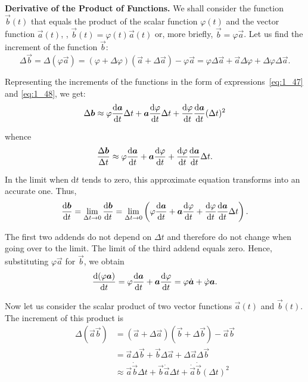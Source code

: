 \textbf{Derivative of the Product of Functions.} We shall consider the function $\vec{b}(t)$ that equals the product of the scalar function $\varphi(t)$ and the vector function $\vec{a}(t)$, \ie, $\vec{b}(t)=\varphi(t)\vec{a}(t)$ or, more briefly, $\vec{b}=\varphi\vec{a}$. Let us find the increment of the function $\vec{b}$:
\begin{equation*}
\Delta\vec{b} = \Delta(\varphi\vec{a}) = (\varphi + \Delta\varphi)(\vec{a} + \Delta\vec{a}) - \varphi\vec{a} = \varphi\Delta\vec{a} + \vec{a}\Delta\varphi + \Delta\varphi\Delta\vec{a}.
\end{equation*}

\noindent
Representing the increments of the functions in the form of expressions~\eqref{eq:1_47} and \eqref{eq:1_48}, we get:
\begin{equation*}
\Delta\boldsymbol{b} \approx \varphi\frac{\mathrm{d}\boldsymbol{a}}{\mathrm{d} t}\Delta t + \boldsymbol{a}\frac{\mathrm{d}\varphi}{\mathrm{d} t}\Delta t + \frac{\mathrm{d}\varphi}{\mathrm{d} t}\frac{\mathrm{d}\boldsymbol{a}}{\mathrm{d} t}(\Delta t)^2
\end{equation*}

\noindent
whence
\begin{equation*}
\frac{\Delta\boldsymbol{b}}{\Delta t} \approx \varphi\frac{\mathrm{d}\boldsymbol{a}}{\mathrm{d} t} + \boldsymbol{a}\frac{\mathrm{d}\varphi}{\mathrm{d} t} + \frac{\mathrm{d}\varphi}{\mathrm{d} t}\frac{\mathrm{d}\boldsymbol{a}}{\mathrm{d} t}\Delta t.
\end{equation*}

\noindent
In the limit when $\mathrm{d}t$ tends to zero, this approximate equation transforms into an accurate one. Thus,
\begin{equation*}
\frac{\mathrm{d}\boldsymbol{b}}{\mathrm{d} t} = \lim_{\Delta t\to 0} \frac{\mathrm{d}\boldsymbol{b}}{\mathrm{d} t} =  \lim_{\Delta t\to 0} \left(\varphi\frac{\mathrm{d}\boldsymbol{a}}{\mathrm{d} t} + \boldsymbol{a}\frac{\mathrm{d}\varphi}{\mathrm{d} t} + \frac{\mathrm{d}\varphi}{\mathrm{d} t} \frac{\mathrm{d}\boldsymbol{a}}{\mathrm{d} t}\Delta t\right).
\end{equation*}

\noindent
The first two addends do not depend on $\Delta t$ and therefore do not change when going over to the limit. The limit of the third addend equals zero. Hence, substituting $\varphi\vec{a}$ for $\vec{b}$, we obtain
\begin{equation}\label{eq:1_49}
\frac{\mathrm{d}(\varphi\boldsymbol{a})}{\mathrm{d} t} = \varphi\frac{\mathrm{d}\boldsymbol{a}}{\mathrm{d} t} + \boldsymbol{a}\frac{\mathrm{d}\varphi}{\mathrm{d} t} = \varphi\dot{\boldsymbol{a}}+\dot{\varphi}\boldsymbol{a}.
\end{equation}

Now let us consider the scalar product of two vector functions $\vec{a}(t)$ and $\vec{b}(t)$. The increment of this product is
\begin{align*}
\Delta(\vec{a}\vec{b}) &= (\vec{a} + \Delta\vec{a})(\vec{b} + \Delta\vec{b}) - \vec{a}\vec{b}\\
&= \vec{a}\Delta\vec{b} + \vec{b}\Delta\vec{a} + \Delta\vec{a}\Delta\vec{b} \\
&\approx \vec{a}\dot{\vec{b}}\Delta t + \vec{b}\dot{\vec{a}}\Delta t + \dot{\vec{a}}\dot{\vec{b}}(\Delta t)^2
\end{align*}


